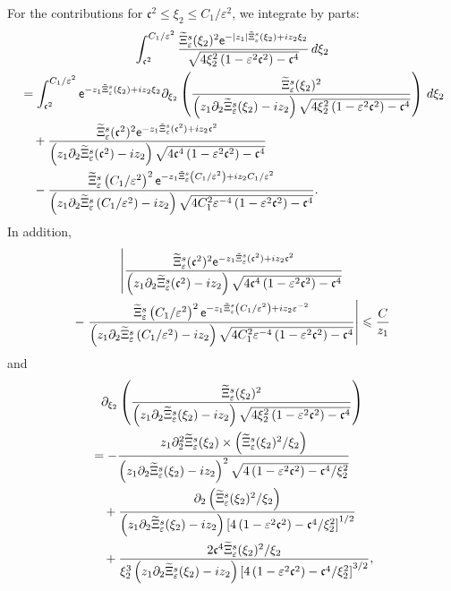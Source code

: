 \documentclass[10pt]{amsart}
\theoremstyle{definition}\newtheorem{defi}[theo]{Definition}\newtheorem{rema}[theo]{Remark}\newtheorem{exam}[theo]{Example}\newtheorem{exem}[theo]{Example}\newtheorem{nota}[theo]{Notation}
\newcommand*\p{\partial}
\newcommand*\ex{{\sf e}}
\newcommand*\cs{{\mathfrak c}}
\newcommand*\ls{\leqslant }
\newcommand*\e{\varepsilon}
\renewcommand*\t{\tilde}
\let\oldtilde\tilde
\renewcommand*{\tilde}[1]{\mathchoice{\widetilde{#1}}{\widetilde{#1}}{\oldtilde{#1}}{\oldtilde{#1}}}
\begin{document}
For the contributions for $ \cs^2 \ls \xi_2 \ls C_1 /\e^{2} $, we integrate by parts:
\begin{multline}\label{K111_zero_IPP}
\int_{ \cs^2 }^{ C_1 / \e^{2} } \frac{ \t\Xi_\e^s (\xi_2)^2 \ex^{- |z_1| \t\Xi_\e^s (\xi_2) + i z_2 \xi_2} }{
\sqrt{ 4 \xi_2^2 \left(1 - \e^2 \cs^2\right) - \cs^4 } } \, d\xi_2
\\
\begin{aligned}
&= \int_{ \cs^2 }^{ C_1 /\e^{2} } \ex^{- z_1 \t\Xi_\e^s (\xi_2) + i z_2 \xi_2}
\p_{\xi_2} \left(\frac{ \t\Xi_\e^s (\xi_2)^2 }{ \left(z_1 \p_2 \t\Xi_\e^s (\xi_2) - i z_2\right) \sqrt{ 4 \xi_2^2 \left(1 - \e^2 \cs^2\right) - \cs^4 } } \right) \, d\xi_2
\\ & \quad + \frac{ \t\Xi_\e^s (\cs^2)^2 \ex^{- z_1 \t\Xi_\e^s (\cs^2) + i z_2 \cs^2} }{\left(z_1 \p_2 \t\Xi_\e^s (\cs^2) - i z_2\right) \sqrt{ 4 \cs^4 \left(1 - \e^2 \cs^2\right) - \cs^4 } }\\
& \quad - \frac{ \t\Xi_\e^s \left(C_1/ \e^{2}\right)^2 \ex^{- z_1 \t\Xi_\e^s \left(C_1 / \e^{2}\right) + i z_2 C_1 / \e^{2}}}{\left(z_1 \p_2 \t\Xi_\e^s \left(C_1 / \e^{2}\right) - i z_2\right) \sqrt{ 4 C_1^2 \e^{-4} \left(1 - \e^2 \cs^2\right) - \cs^4}}.
\end{aligned}
\end{multline}
In addition,
\begin{multline*}
\left\lvert  \frac{ \t\Xi_\e^s (\cs^2)^2 \ex^{- z_1 \t\Xi_\e^s (\cs^2) + i z_2 \cs^2} }{\left(z_1 \p_2 \t\Xi_\e^s (\cs^2) - i z_2\right) \sqrt{4 \cs^4 \left(1 - \e^2 \cs^2\right) - \cs^4}}\right.
\\ -\left. \frac{\t\Xi_\e^s \left(C_1 / \e^{2}\right)^2 \ex^{- z_1 \t\Xi_\e^s \left(C_1 / \e^{2}\right) + i z_2 \e^{-2}}}{\left(z_1 \p_2 \t\Xi_\e^s \left(C_1 / \e^{2}\right) - i z_2\right) \sqrt{4 C_1^2 \e^{-4}\left(1 - \e^2 \cs^2\right) - \cs^4}}
\right\rvert
\ls \frac{C}{z_1}
\end{multline*}
and
\begin{multline}\label{IPP_K111}
\p_{\xi_2} \left(\frac{ \t\Xi_\e^s (\xi_2)^2 }{\left(z_1 \p_2 \t\Xi_\e^s (\xi_2) - i z_2\right) \sqrt{ 4 \xi_2^2 \left(1 - \e^2 \cs^2\right) - \cs^4}} \right)
\\
\begin{aligned}
& = - \frac{ z_1 \p_2^2 \t\Xi_\e^s (\xi_2) \times \left(\t\Xi_\e^s (\xi_2)^2 / \xi_2\right)}{\left(z_1 \p_2 \t\Xi_\e^s (\xi_2) - i z_2\right)^2 \sqrt{4\left(1 - \e^2 \cs^2\right) - \cs^4 /\xi_2^2}}
\\
& \quad + \frac{ \p_2 \left(\t\Xi_\e^s (\xi_2)^2 / \xi_2\right)}{\left(z_1 \p_2 \t\Xi_\e^s (\xi_2) - i z_2\right)\left[4\left(1 - \e^2 \cs^2\right) - \cs^4 /\xi_2^2\right]^{1/2}}
\\
& \quad + \frac{ 2 \cs^4 \t\Xi_\e^s (\xi_2)^2 / \xi_2}{\xi_2^3 \left(z_1 \p_2 \t\Xi_\e^s (\xi_2) - i z_2\right)\left[4\left(1 - \e^2 \cs^2\right) - \cs^4 /\xi_2^2\right]^{3/2}},
\end{aligned}
\end{multline}
\end{document}
